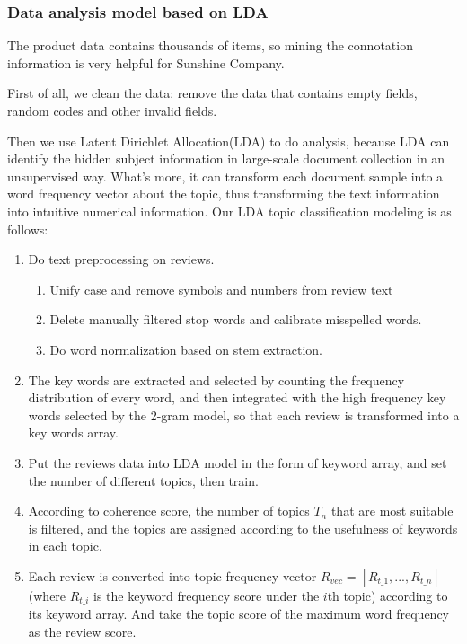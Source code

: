 \documentclass{mcmthesis}
\begin{document}
\subsubsection{Data analysis model based on LDA}
The product data contains thousands of items, so mining the connotation information is very helpful for Sunshine Company.

First of all, we clean the data: remove the data that contains empty fields, random codes and other invalid fields. 

Then we use Latent Dirichlet Allocation(LDA)\cite{blei2003latent} to do analysis, because LDA can identify the hidden subject information in large-scale document collection in an unsupervised way. What's more, it can transform each document sample into a word frequency vector about the topic, thus transforming the text information into intuitive numerical information. Our LDA topic classification modeling is as follows:
\begin{enumerate}
	\item Do text preprocessing on reviews.
		\begin{enumerate}
			\item Unify case and remove symbols and numbers from review text
			\item Delete manually filtered stop words and calibrate misspelled words.
			\item Do word normalization based on stem extraction.
		\end{enumerate}
	\item The key words are extracted and selected by counting the frequency distribution of every word, and then integrated with the high frequency key words selected by the 2-gram model\cite{zhang2006lord}, so that each review is transformed into a key words array.
	\item Put the reviews data into LDA model in the form of  keyword array, and set the number of different topics, then train.
	\item According to coherence score, the number of topics $T_{n}$ that are most suitable is filtered, and the topics are assigned according to the usefulness of keywords in each topic.
	\item Each review is converted into topic frequency vector $R_{vec}=[R_{t\_1},...,R_{t\_n}]$  (where $R_{t\_i}$ is the keyword frequency score under the $i$th topic) according to its keyword array. And take the topic score of the maximum word frequency as the review score.
\end{enumerate}
\end{document}
